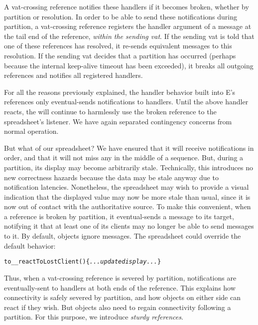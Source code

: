 \documentclass{llncs}
\begin{document}
A vat-crossing reference notifies these handlers if it becomes broken,
whether by partition or resolution. In order to be able to send these
notifications during partition, a vat-crossing reference registers the
handler argument of a  message at the tail end of
the reference, \emph{within the sending vat}. If the sending vat is
told that one of these references has resolved, it re-sends equivalent
 messages to this resolution. If the sending vat
decides that a partition has occurred (perhaps because the internal
keep-alive timeout has been exceeded), it breaks all outgoing
references and notifies all registered handlers.

For all the reasons previously explained, the handler behavior built
into E's references only eventual-sends notifications to
handlers. Until the above handler reacts, the  will
continue to harmlessly use the broken reference to the spreadsheet's
listener. We have again separated contingency concerns from normal
operation.

But what of our spreadsheet? We have ensured that it will receive
 notifications in order, and that it will not miss
any in the middle of a sequence. But, during a partition, its display
may become arbitrarily stale. Technically, this introduces no new
correctness hazards because the data may be stale anyway due to
notification latencies. Nonetheless, the spreadsheet may wish to
provide a visual indication that the displayed value may now be more
stale than usual, since it is now out of contact with the
authoritative source. To make this convenient, when a reference is
broken by partition, it eventual-sends a 
message to its target, notifying it that at least one of its clients
may no longer be able to send messages to it. By default, objects
ignore  messages. The spreadsheet could
override the default behavior:
%
\begin{alltt}
    to \_\_reactToLostClient() \{ {\it ...update display...} \}
\end{alltt}
%
Thus, when a vat-crossing reference is severed by partition,
notifications are eventually-sent to handlers at both ends of the
reference.  This explains how connectivity is safely severed by
partition, and how objects on either side can react if they wish. But
objects also need to regain connectivity following a partition. For
this purpose, we introduce \emph{sturdy references}.
\end{document}
